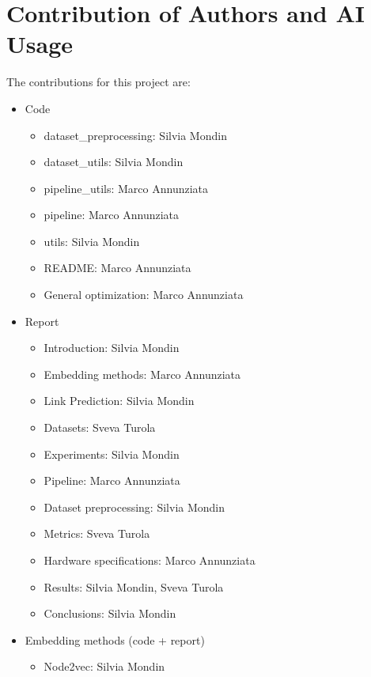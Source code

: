\appendix
\section*{Contribution of Authors and AI Usage}

The contributions for this project are:
\begin{itemize}
    \item Code
        \begin{itemize}
            \item dataset\_preprocessing: Silvia Mondin
            \item dataset\_utils: Silvia Mondin
            \item pipeline\_utils: Marco Annunziata
            \item pipeline: Marco Annunziata
            \item utils: Silvia Mondin
            \item README: Marco Annunziata
            \item General optimization: Marco Annunziata
        \end{itemize}
    \item Report
        \begin{itemize}
            \item Introduction: Silvia Mondin
            \item Embedding methods: Marco Annunziata
            \item Link Prediction: Silvia Mondin
            \item Datasets: Sveva Turola
            \item Experiments: Silvia Mondin
            \item Pipeline: Marco Annunziata
            \item Dataset preprocessing: Silvia Mondin
            \item Metrics: Sveva Turola
            \item Hardware specifications: Marco Annunziata
            \item Results: Silvia Mondin, Sveva Turola
            \item Conclusions: Silvia Mondin
        \end{itemize}
    \item Embedding methods (code + report)
        \begin{itemize}
            \item Node2vec: Silvia Mondin

\end{itemize}
\end{itemize}
